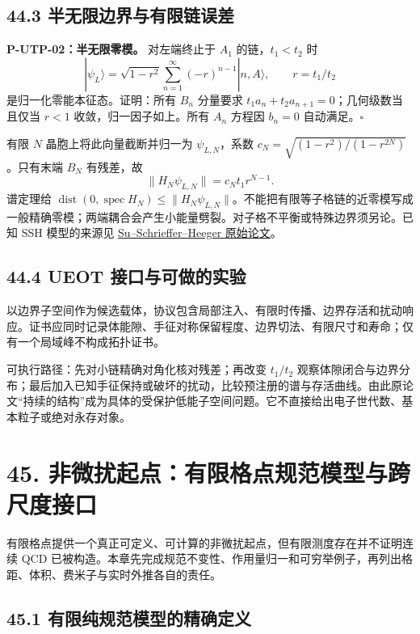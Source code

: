 \documentclass[
  11pt,
  oneside]{book}
\begin{document}
\section{44.3 半无限边界与有限链误差}

\protect\hypertarget{p-utp-02}{}{}

\textbf{P-UTP-02：半无限零模。} 对左端终止于 \(A_1\) 的链，\(t_1<t_2\)
时 \[
|\psi_L\rangle=\sqrt{1-r^2}\sum_{n=1}^\infty(-r)^{n-1}|n,A\rangle,
\qquad r=t_1/t_2
\] 是归一化零能本征态。证明：所有 \(B_n\) 分量要求
\(t_1a_n+t_2a_{n+1}=0\)；几何级数当且仅当 \(r<1\)
收敛，归一因子如上。所有 \(A_n\) 方程因 \(b_n=0\) 自动满足。\(\square\)

有限 \(N\) 晶胞上将此向量截断并归一为 \(\psi_{L,N}\)，系数
\(c_N=\sqrt{(1-r^2)/(1-r^{2N})}\)。只有末端 \(B_N\) 有残差，故 \[
\|H_N\psi_{L,N}\|=c_Nt_1r^{N-1}.
\] 谱定理给
\(\operatorname{dist}(0,\operatorname{spec}H_N)\le\|H_N\psi_{L,N}\|\)。不能把有限等子格链的近零模写成一般精确零模；两端耦合会产生小能量劈裂。对子格不平衡或特殊边界须另论。已知
SSH 模型的来源见
\href{https://link.aps.org/doi/10.1103/PhysRevLett.42.1698}{Su--Schrieffer--Heeger
原始论文}。

\section{44.4 UEOT 接口与可做的实验}

以边界子空间作为候选载体，协议包含局部注入、有限时传播、边界存活和扰动响应。证书应同时记录体能隙、手征对称保留程度、边界切法、有限尺寸和寿命；仅有一个局域峰不构成拓扑证书。

可执行路径：先对小链精确对角化核对残差；再改变 \(t_1/t_2\)
观察体隙闭合与边界分布；最后加入已知手征保持或破坏的扰动，比较预注册的谱与存活曲线。由此原论文``持续的结构''成为具体的受保护低能子空间问题。它不直接给出电子世代数、基本粒子或绝对永存对象。

\chapter{45. 非微扰起点：有限格点规范模型与跨尺度接口}\label{ch-45}\hypertarget{ch-45}{}

有限格点提供一个真正可定义、可计算的非微扰起点，但有限测度存在并不证明连续
QCD
已被构造。本章先完成规范不变性、作用量归一和可穷举例子，再列出格距、体积、费米子与实时外推各自的责任。

\section{45.1 有限纯规范模型的精确定义}
\end{document}

